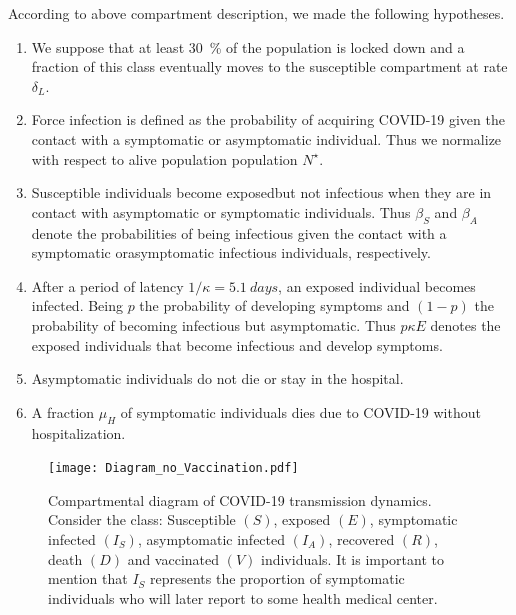 \begin{assumptions}
    According to above compartment description, we made the following
    hypotheses.
    \begin{enumerate}[label={(A-\arabic*)}]
        \item
            We suppose that at least \SI{30}{\percent} of the population is
            locked down and a fraction of this class eventually moves
            to the susceptible compartment at rate $\delta_L$.
        \item
            Force infection is defined as the probability of acquiring COVID-19
            given the contact with a symptomatic or asymptomatic individual.
            Thus we normalize with respect to alive population population
            $
                N^{\star}
            $.
        \item
            Susceptible individuals become
            exposed\textemdash but not infectious\textemdash
            when they are in contact with asymptomatic or symptomatic
            individuals. Thus $\beta_S$ and $\beta_A$ denote the
            probabilities of being infectious given the contact with a 
            symptomatic orasymptomatic infectious individuals, respectively.
        \item
            After a period of latency  $1/\kappa = \SI{5.1}{days}$, an
            exposed individual becomes infected. Being $p$ the probability of
            developing symptoms and $(1-p)$ the probability of becoming infectious
            but asymptomatic. Thus $p\kappa E$ denotes the
            exposed individuals that become infectious and develop symptoms.
        \item
            Asymptomatic individuals do not die or stay in the hospital.
        \item
            A fraction $\mu_{H}$ of symptomatic individuals
            dies due to COVID-19 without hospitalization.
    \end{enumerate}
\end{assumptions}

\begin{figure}[tbh]
    \centering
      \texttt{[image: Diagram\_no\_Vaccination.pdf]}
        \caption{
            Compartmental diagram of COVID-19 transmission dynamics. 
            Consider the class: Susceptible $(S)$, exposed $(E)$, symptomatic 
            infected $(I_S)$, asymptomatic infected $(I_A)$, recovered $(R)$, 
            death $(D)$ and vaccinated $(V)$ individuals. It is important to 
            mention that $I_{S}$ represents the proportion of symptomatic 
            individuals who will later report to some health medical center.
        }
    \label{fig:diagramnolockdownandVacc}
\end{figure}


